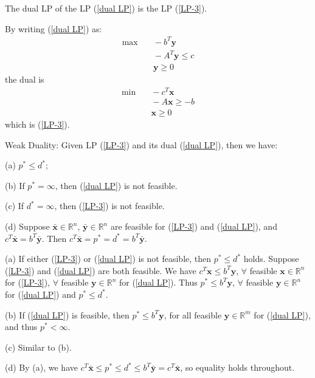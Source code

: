 \begin{proposition}
    The dual LP of the LP (\ref{dual LP}) is the LP (\ref{LP-3}).
\end{proposition}
\begin{solution}
    By writing (\ref{dual LP}) as:
    \begin{align*}
        \max &\quad -b^T\boldsymbol{y} \\
        & \quad -A^T\boldsymbol{y}\le c \\
        & \quad \boldsymbol{y}\ge 0
    \end{align*}
    the dual is 
    \begin{align*}
        \min &\quad -c^T\boldsymbol{x} \\
        &\quad -A\boldsymbol{x}\ge -b \\
        &\quad \boldsymbol{x}\ge 0
    \end{align*}
    which is (\ref{LP-3}).
\end{solution}
\begin{theorem}
    Weak Duality: Given LP (\ref{LP-3}) and its dual (\ref{dual LP}), then we have:

    (a) $p^*\le d^*$;

    (b) If $p^* = \infty$, then (\ref{dual LP}) is not feasible.

    (c) If $d^* = \infty$, then (\ref{LP-3}) is not feasible.

    (d) Suppose $\bar{\boldsymbol{x}}\in\mathbb{R}^n$, $\bar{\boldsymbol{y}}\in\mathbb{R}^n$ are feasible for (\ref{LP-3}) and (\ref{dual LP}), and $c^T\bar{\boldsymbol{x}} = b^T\bar{\boldsymbol{y}}$. Then $c^T\bar{\boldsymbol{x}} = p^* = d^* = b^T\bar{\boldsymbol{y}}$.
\end{theorem}
\begin{solution}
    (a) If either (\ref{LP-3}) or (\ref{dual LP}) is not feasible, then $p^*\le d^*$ holds. Suppose (\ref{LP-3}) and (\ref{dual LP}) are both feasible. We have $c^T\boldsymbol{x}\le b^T\boldsymbol{y}$, $\forall$ feasible $\boldsymbol{x}\in\mathbb{R}^n$ for (\ref{LP-3}), $\forall$ feasible $\boldsymbol{y}\in\mathbb{R}^n$ for (\ref{dual LP}). Thus $p^*\le b^T \boldsymbol{y}$, $\forall$ feasible $\boldsymbol{y}\in\mathbb{R}^n$ for (\ref{dual LP}) and $p^*\le d^*$.

    (b) If (\ref{dual LP}) is feasible, then $p^*\le b^T \boldsymbol{y}$, for all feasible $\boldsymbol{y}\in\mathbb{R}^m$ for (\ref{dual LP}), and thus $p^*<\infty$.

    (c) Similar to (b).

    (d) By (a), we have $c^T\bar{\boldsymbol{x}}\le p^* \le d^* \le b^T\bar{\boldsymbol{y}} = c^T\bar{\boldsymbol{x}}$, so equality holds throughout.
\end{solution}

